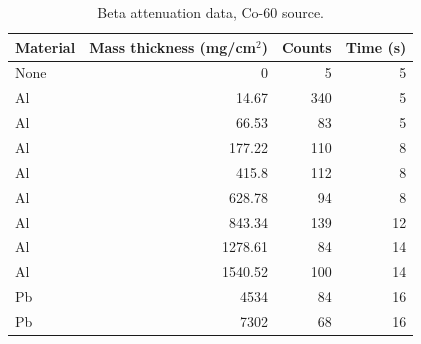 \begin{table}[htbp]
\centering
\caption{Beta attenuation data, Co-60 source.}
\label{tab:beta-raw}
\begin{tabular}{lrrr}
\toprule
Material & Mass thickness (mg/cm$^2$) & Counts & Time (s) \\
\midrule
None & 0 & 5 & 5 \\
Al & 14.67 & 340 & 5 \\
Al & 66.53 & 83 & 5 \\
Al & 177.22 & 110 & 8 \\
Al & 415.8 & 112 & 8 \\
Al & 628.78 & 94 & 8 \\
Al & 843.34 & 139 & 12 \\
Al & 1278.61 & 84 & 14 \\
Al & 1540.52 & 100 & 14 \\
Pb & 4534 & 84 & 16 \\
Pb & 7302 & 68 & 16 \\
\bottomrule
\end{tabular}
\end{table}

